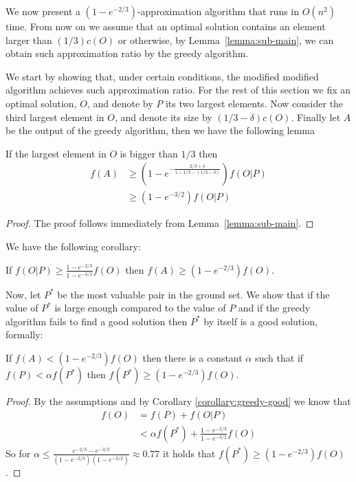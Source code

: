 We now present a $(1-e^{-2/3})$-approximation algorithm that runs in $O(n^2)$ time.
From now on we assume that an optimal solution contains an element larger than $(1/3)c(O)$ or otherwise, by Lemma~\ref{lemma:sub-main}, we can obtain such approximation ratio by the greedy algorithm.

We start by showing that,  under certain conditions, the modified modified algorithm achieves such approximation ratio.
For the rest of this section we fix an optimal solution, $O$, and denote by $P$ its two largest elements.
Now consider the third largest element in $O$, and denote its size by $(1/3 - \delta)c(O)$.
Finally let $A$ be the output of the greedy algorithm, then we have the following lemma

\begin{lemma}
	\label{eq:sub:greedy}
	If the largest element in $O$ is bigger than $1/3$ then
	\begin{align*}
		f(A) & \geq (1-e^{-\frac{2/3 + \delta}{1 - 1/3 - (1/3 - \delta)}})f(O|P)
		\\		& \geq (1 - e^{-3/2})f(O|P)
	\end{align*}
\end{lemma}

\begin{proof}
	The proof follows immediately from Lemma~\ref{lemma:sub-main}.
\end{proof}

We have the following corollary:
\begin{corollary}
	\label{corollary:greedy-good}
	If $f(O|P) \geq \frac{1-e^{-2/3}}{1-e^{-3/2}}f(O)$ then $f(A) \geq (1 - e^{-2/3})f(O)$.
\end{corollary}

Now, let $P^*$ be the most valuable pair in the ground set.
We show that if the value of $P^*$ is large enough compared to the value of $P$ and if the greedy algorithm fails to find a good solution then $P^*$ by itself is a good solution, formally:

\begin{lemma}
	\label{lemma:sub:alpha}
	If $f(A) < (1 - e^{-2/3})f(O)$ then there is a constant $\alpha$ such that if $f(P) < \alpha f(P^*)$ then $f(P^*) \geq (1 - e^{-2/3})f(O)$.
\end{lemma}

\begin{proof}
	By the assumptions and by Corollary \ref{corollary:greedy-good} we know that 
	\begin{align}
		f(O)	& = f(P) + f(O|P) 
		\\ 		& < \alpha f(P^*) + \frac{1-e^{-2/3}}{1-e^{-3/2}}f(O)
	\end{align}
	So for $\alpha \leq \frac{e^{-2/3} - e^{-3/2}}{(1-e^{-2/3})(1-e^{-3/2})} \approx 0.77$ it holds that $f(P^*) \geq (1 - e^{-2/3})f(O)$.
\end{proof}

